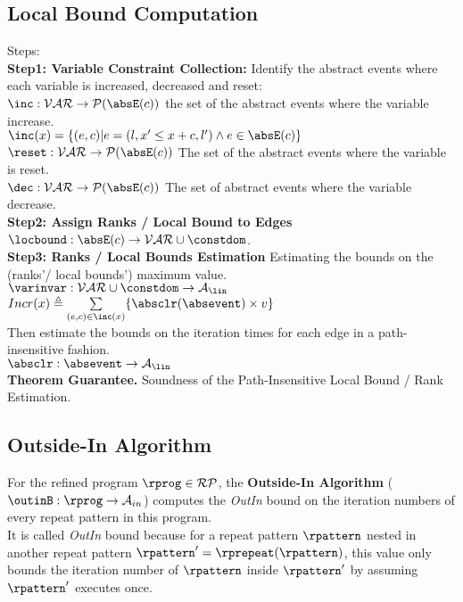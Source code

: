 \subsection{Local Bound Computation}
\label{sec:lbcompute}
Steps:
\\
\textbf{Step1: Variable Constraint Collection:}
Identify the abstract events where each variable is increased, decreased and reset:
\\
$\inc: \mathcal{VAR} \to \mathcal{P}(\absE(c)) $
the set of the abstract events where the variable increase.
\\
$\inc(x) = \{(e, c) | e = (l, x' \leq x + c, l') \land e \in \absE(c)\}$
\\
$\reset: \mathcal{VAR} \to \mathcal{P}(\absE(c)) $
The set of the abstract events where the variable is reset.
\\
$\dec: \mathcal{VAR} \to \mathcal{P}(\absE(c)) $
The set of abstract events where the variable decrease.
\\
\textbf{{Step2: Assign Ranks / Local Bound to Edges}}
$\locbound: \absE(c) \to \mathcal{VAR} \cup \constdom$.
 \\
\textbf{Step3: Ranks / Local Bounds Estimation}
Estimating the bounds on the (ranks'/ local bounds') maximum value.
\\ 
$ \varinvar: \mathcal{VAR} \cup \constdom \to \mathcal{A}_{\lin}$
\\
$Incr(x) \triangleq \sum\limits_{(e, c) \in \inc(x)}\{\absclr(\absevent) \times v\}$
\\
Then estimate the bounds on the iteration times
for each edge in a path-insensitive fashion.
\\
$\absclr: \absevent \to \mathcal{A}_{\lin}$
\\
\textbf{Theorem Guarantee.}
Soundness of the Path-Insensitive Local Bound / Rank Estimation.
\subsection{Outside-In Algorithm}
\label{sec:outinalg}
For the refined program $\rprog \in \mathcal{RP}$, the \textbf{Outside-In Algorithm} ($\outinB: \rprog \to \mathcal{A}_{in}$)
computes the \emph{OutIn} bound on the iteration numbers of every repeat pattern in this program.
\\
It is called \emph{OutIn} bound because for a repeat pattern $\rpattern$ nested
in another repeat pattern $\rpattern' = \rprepeat(\rpattern)$,
this value only bounds the iteration number of $\rpattern$ inside $\rpattern'$ by assuming $\rpattern'$ executes once.

